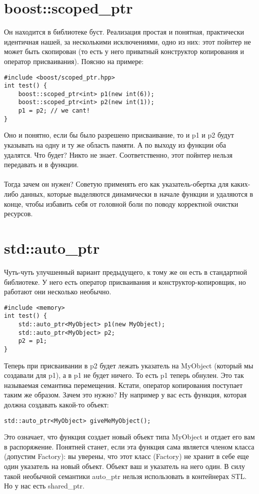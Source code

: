 \documentclass {article}
\begin{document}
\section{boost::scoped\_ptr}
Он находится в библиотеке буст.
Реализация простая и понятная, практически идентичная нашей, за несколькими исключениями, одно из них: этот пойнтер не может быть скопирован (то есть у него приватный конструктор копирования и оператор присваивания). Поясню на примере:
\begin{lstlisting}[caption=Пример]
#include <boost/scoped_ptr.hpp>
int test() {
    boost::scoped_ptr<int> p1(new int(6));
    boost::scoped_ptr<int> p2(new int(1));    
    p1 = p2; // we cant!
}
\end{lstlisting}
Оно и понятно, если бы было разрешено присваивание, то и p1 и p2 будут указывать на одну и ту же область памяти. А по выходу из функции оба удалятся. Что будет? Никто не знает. Соответственно, этот пойнтер нельзя передавать и в функции.\\\\
Тогда зачем он нужен? Советую применять его как указатель-обертка для каких-либо данных, которые выделяются динамически в начале функции и удаляются в конце, чтобы избавить себя от головной боли по поводу корректной очистки ресурсов.
\section{std::auto\_ptr}
Чуть-чуть улучшенный вариант предыдущего, к тому же он есть в стандартной библиотеке. У него есть оператор присваивания и конструктор-копировщик, но работают они несколько необычно.
\begin{lstlisting}[caption=Пример]
#include <memory>
int test() {
    std::auto_ptr<MyObject> p1(new MyObject);
    std::auto_ptr<MyObject> p2;    
    p2 = p1;
}
\end{lstlisting}
Теперь при присваивании в p2 будет лежать указатель на MyObject (который мы создавали для p1), а в p1 не будет ничего. То есть p1 теперь обнулен. Это так называемая семантика перемещения. Кстати, оператор копирования поступает таким же образом.
Зачем это нужно? Ну например у вас есть функция, которая должна создавать какой-то объект:
\begin{lstlisting}[caption=Пример]
    std::auto_ptr<MyObject> giveMeMyObject();
\end{lstlisting}
Это означает, что функция создает новый объект типа MyObject и отдает его вам в распоряжение. Понятней станет, если эта функция сама является членом класса (допустим Factory): вы уверены, что этот класс (Factory) не хранит в себе еще один указатель на новый объект. Объект ваш и указатель на него один.
В силу такой необычной семантики auto\_ptr нельзя использовать в контейнерах STL. Но у нас есть shared\_ptr.
\end{document}
